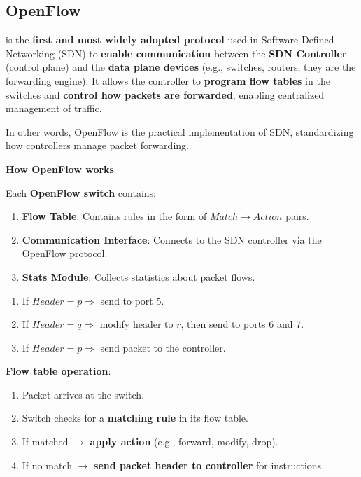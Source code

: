 \subsection{OpenFlow}

 is the \textbf{first and most widely adopted protocol} used in Software-Defined Networking (SDN) to \textbf{enable communication} between the \textbf{SDN Controller} (control plane) and the \textbf{data plane devices} (e.g., switches, routers, they are the forwarding engine). It allows the controller to \textbf{program flow tables} in the switches and \textbf{control how packets are forwarded}, enabling centralized management of traffic.

\highspace
In other words, OpenFlow is the practical implementation of SDN, standardizing how controllers manage packet forwarding.

\highspace
\begin{flushleft}
    \textcolor{Green3}{ \textbf{How OpenFlow works}}
\end{flushleft}
Each \textbf{OpenFlow switch} contains:
\begin{enumerate}
    \item \textbf{Flow Table}: Contains rules in the form of $Match \rightarrow Action$ pairs.
    \item \textbf{Communication Interface}: Connects to the SDN controller via the OpenFlow protocol.
    \item \textbf{Stats Module}: Collects statistics about packet flows.
\end{enumerate}

\highspace
\begin{examplebox}
    \begin{enumerate}
        \item If $Header = p \Rightarrow$ send to port 5.
        \item If $Header = q \Rightarrow$ modify header to $r$, then send to ports 6 and 7.
        \item If $Header = p \Rightarrow$ send packet to the controller.
    \end{enumerate}
\end{examplebox}

\highspace
\textbf{Flow table operation}:
\begin{enumerate}
    \item Packet arrives at the switch.
    \item Switch checks for a \textbf{matching rule} in its flow table.
    \item If matched $\rightarrow$ \textbf{apply action} (e.g., forward, modify, drop).
    \item If no match $\rightarrow$ \textbf{send packet header to controller} for instructions.
\end{enumerate}

